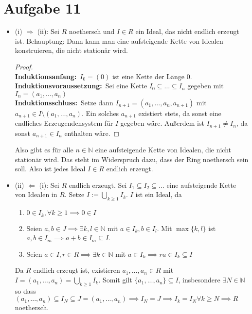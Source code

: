 \documentclass{article}
\theoremstyle{definition}
\newcommand{\N}{\mathbb{N}}
\newcommand{\induktion}[3]
{\begin{proof}\ \\
	\noindent\textbf{Induktionsanfang:}\ #1\\
	\noindent\textbf{Induktionsvoraussetzung:}\ #2\\
	\noindent\textbf{Induktionsschluss:}\ #3
\end{proof}}
\begin{document}
\section*{Aufgabe 11}
\begin{itemize}
	\item (i) $\Rightarrow$ (ii): Sei $R$ noethersch und $I\in R$ ein Ideal, das nicht endlich erzeugt ist. Behauptung: Dann kann man eine aufsteigende Kette von Idealen konstruieren, die nicht stationär wird.
	\induktion{$I_0 = (0)$ ist eine Kette der Länge 0.}{Sei eine Kette $I_0 \subseteq \dots \subseteq I_n$ gegeben mit $I_n = (a_1, \dots, a_n)$}{Setze dann $I_{n+1} = (a_1, \dots, a_n, a_{n+1})$ mit $a_{n+1} \in I\setminus(a_1, \dots, a_n)$. Ein solches $a_{n+1}$ existiert stets, da sonst eine endliches Erzeugendensystem für $I$ gegeben wäre. Außerdem ist $I_{n+1} \neq I_n$, da sonst $a_{n+1} \in I_n$ enthalten wäre.} Also gibt es für alle $n\in \N$ eine aufsteigende Kette von Idealen, die nicht stationär wird. Das steht im Widerspruch dazu, dass der Ring noethersch sein soll. Also ist jedes Ideal $I\in R$ endlich erzeugt. 
	\item (ii) $\Leftarrow$ (i): Sei $R$ endlich erzeugt. Sei $I_1\subseteq I_2 \subseteq ... $ eine aufsteigende Kette von Idealen in $R$. Setze $I:=\bigcup\limits_{k\geq 1}I_{k}.$ $I$ ist ein Ideal, da 
		\begin{enumerate}[(J1)]
			\item $0\in I_k, \forall k\geq 1 \implies 0\in I$
			\item Seien $a,b\in J \implies \exists k, l\in \N $ mit $a\in I_k, b\in I_l$. Mit $\max\{k,l\}$ ist $a,b\in I_m \implies a+b\in I_m\subseteq I$.
			\item Seien $a\in I, r\in R \implies \exists k\in \N $ mit $a\in I_k \implies ra\in I_k\subseteq I$
		\end{enumerate}
	Da $R$ endlich erzeugt ist, existieren $a_1, \dots, a_n \in R$ mit $I=(a_1,...,a_n)= \bigcup\limits_{k\geq 1}I_k$. Somit gilt $\{a_1,...,a_n\} \subseteq I$, insbesondere $\exists N\in\N$ so dass $(a_1,...,a_n)\subseteq I_N\subseteq J = (a_1,...,a_n)\implies I_N=J\implies I_k=I_N \forall k\geq N \implies R$ noethersch.
\end{itemize}
	
\end{document}
